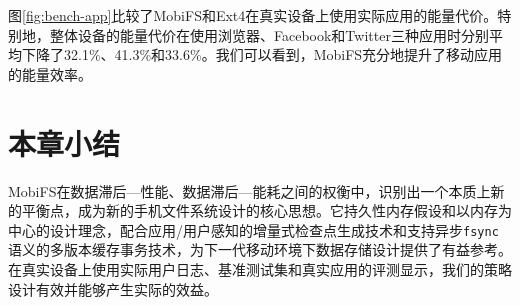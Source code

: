 图\ref{fig:bench-app}比较了MobiFS和Ext4在真实设备上使用实际应用的能量代价。特别地，整体设备的能量代价在使用浏览器、Facebook和Twitter三种应用时分别平均下降了32.1\%、41.3\%和33.6\%。我们可以看到，MobiFS充分地提升了移动应用的能量效率。

\section{本章小结}

MobiFS在数据滞后—性能、数据滞后—能耗之间的权衡中，识别出一个本质上新的平衡点，成为新的手机文件系统设计的核心思想。它持久性内存假设和以内存为中心的设计理念，配合应用/用户感知的增量式检查点生成技术和支持异步\texttt{fsync}语义的多版本缓存事务技术，为下一代移动环境下数据存储设计提供了有益参考。在真实设备上使用实际用户日志、基准测试集和真实应用的评测显示，我们的策略设计有效并能够产生实际的效益。

